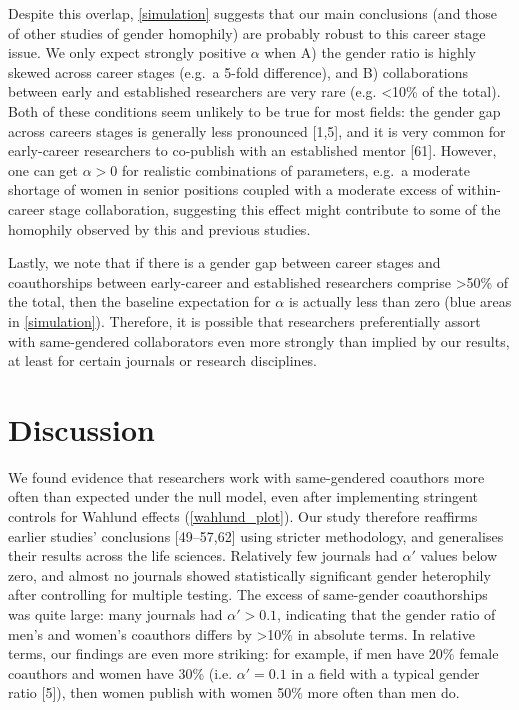 \documentclass[12pt,]{article}
\begin{document}
Despite this overlap, \autoref{simulation} suggests that our main
conclusions (and those of other studies of gender homophily) are
probably robust to this career stage issue. We only expect strongly
positive \(\alpha\) when A) the gender ratio is highly skewed across
career stages (e.g.~a 5-fold difference), and B) collaborations between
early and established researchers are very rare (e.g. \textless{}10\% of
the total). Both of these conditions seem unlikely to be true for most
fields: the gender gap across careers stages is generally less
pronounced {[}1,5{]}, and it is very common for early-career researchers
to co-publish with an established mentor {[}61{]}. However, one can get
\(\alpha > 0\) for realistic combinations of parameters, e.g.~a moderate
shortage of women in senior positions coupled with a moderate excess of
within-career stage collaboration, suggesting this effect might
contribute to some of the homophily observed by this and previous
studies.

Lastly, we note that if there is a gender gap between career stages and
coauthorships between early-career and established researchers comprise
\textgreater{}50\% of the total, then the baseline expectation for
\(\alpha\) is actually less than zero (blue areas in
\autoref{simulation}). Therefore, it is possible that researchers
preferentially assort with same-gendered collaborators even more
strongly than implied by our results, at least for certain journals or
research disciplines.

\section{Discussion}\label{discussion}

We found evidence that researchers work with same-gendered coauthors
more often than expected under the null model, even after implementing
stringent controls for Wahlund effects (\autoref{wahlund_plot}). Our
study therefore reaffirms earlier studies' conclusions {[}49--57,62{]}
using stricter methodology, and generalises their results across the
life sciences. Relatively few journals had \(\alpha'\) values below
zero, and almost no journals showed statistically significant gender
heterophily after controlling for multiple testing. The excess of
same-gender coauthorships was quite large: many journals had
\(\alpha' > 0.1\), indicating that the gender ratio of men's and women's
coauthors differs by \textgreater{}10\% in absolute terms. In relative
terms, our findings are even more striking: for example, if men have
20\% female coauthors and women have 30\% (i.e. \(\alpha' = 0.1\) in a
field with a typical gender ratio {[}5{]}), then women publish with
women 50\% more often than men do.
\end{document}
